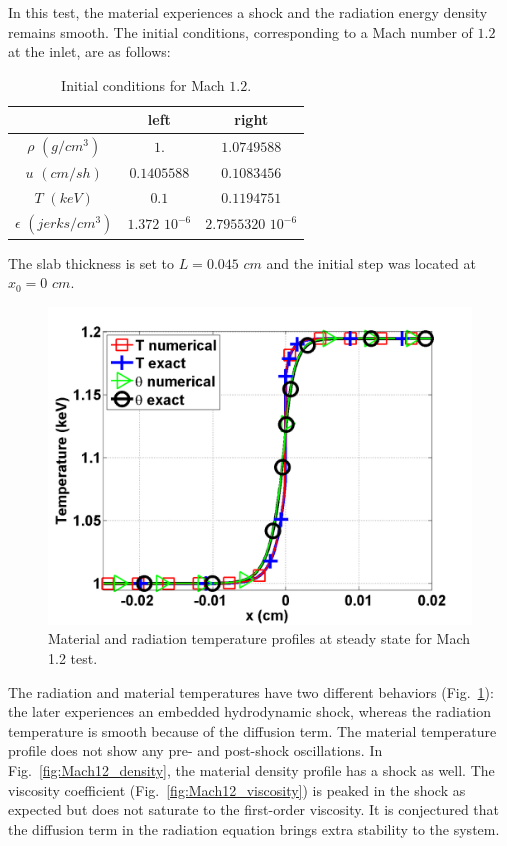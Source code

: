 \documentclass[review]{elsarticle}
\newcommand{\fig}[1]{Fig.~\ref{#1}}                      %
\begin{document}
In this test, the material experiences a shock and the radiation energy density remains smooth. The initial conditions, corresponding to a Mach number of $1.2$ at the inlet, are as follows: 
\begin{table}[H]
\caption{\label{tbl:table4} Initial conditions for Mach $1.2$.}
\begin{center}
\begin{tabular}{|c|c|c|}
\hline 
 & left  & right \\ \hline
$\rho$ $(g/cm^3)$ &$1.$ & $1.0749588$ \\ \hline
$u$ $(cm/sh)$& $0.1405588$ & $0.1083456$ \\ \hline
$T$ $(keV)$& $0.1$ & $0.1194751$\\ \hline
$\epsilon$ $(jerks/cm^3)$ & $1.372$ $10^{-6}$ & $2.7955320$ $10^{-6}$\\
\hline
\end{tabular}  
\end{center}  
\end{table}
The slab thickness is set to $L=0.045$ $cm$ and the initial step was located at $x_0 = 0$ $cm$. 
\begin{figure}[H]
       \centering
       \includegraphics[width=\textwidth]{Mach_1p2_nel_1000_temperature.png}
       \caption{Material and radiation temperature profiles at steady state for Mach 1.2 test.}\label{fig:Mach12_temp}
\end{figure}
The radiation and material temperatures have two different behaviors (\fig{fig:Mach12_temp}): the later experiences an embedded hydrodynamic shock, whereas the radiation temperature is smooth because of the diffusion term. The material temperature profile does not show any pre- and post-shock oscillations. In \fig{fig:Mach12_density}, the material density profile has a shock as well. The viscosity coefficient (\fig{fig:Mach12_viscosity}) is peaked in the shock as expected but does not saturate to the first-order viscosity. It is conjectured that the diffusion term in the radiation equation brings extra stability to the system. \\
\end{document}
